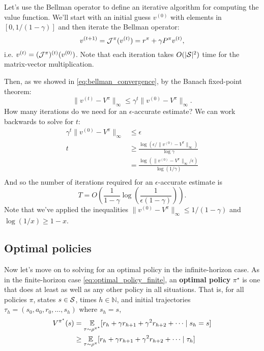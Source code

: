 \documentclass[../main/main]{subfiles}
\begin{document}
Let's use the Bellman operator to define an iterative algorithm for computing the value function. We'll start with an initial guess $v^{(0)}$ with elements in $[0, 1/(1-\gamma)]$ and then iterate the Bellman operator:
\[
    v^{(t+1)} = \bop^{\pi}(v^{(t)}) = r^{\pi} + \gamma P^{\pi} v^{(t)},
\]
i.e. $v^{(t)} = (\bop^{\pi})^{(t)} (v^{(0)})$. Note that each iteration takes $O(|\S|^2)$ time for the matrix-vector multiplication.

Then, as we showed in \eqref{eq:bellman_convergence}, by the Banach fixed-point theorem:
\[
    \|v^{(t)} - V^\pi \|_{\infty} \le \gamma^{t} \| v^{(0)} - V^\pi\|_{\infty}.
\]
How many iterations do we need for an $\epsilon$-accurate estimate? We can work backwards to solve for $t$:
\begin{align*}
    \gamma^t \|v^{(0)} - V^\pi\|_{\infty} &\le \epsilon \\
    t &\ge \frac{\log (\epsilon / \|v^{(0)} - V^\pi\|_{\infty})}{\log \gamma} \\
    &= \frac{\log (\|v^{(0)} - V^\pi\|_{\infty} / \epsilon)}{\log (1 / \gamma)} \\
\end{align*}
And so the number of iterations required for an $\epsilon$-accurate estimate is
\begin{equation}
    T = O\left( \frac{1}{1-\gamma} \log\left(\frac{1}{\epsilon (1-\gamma)}\right) \right). \label{eq:iterations_vi}
\end{equation}
Note that we've applied the inequalities $\|v^{(0)} - V^\pi\|_{\infty} \le 1/(1-\gamma)$ and $\log (1/x) \ge 1-x$.

\subsection{Optimal policies}

Now let's move on to solving for an optimal policy in the infinite-horizon case. As in the finite-horizon case \eqref{eq:optimal_policy_finite}, an \textbf{optimal policy} $\pi^\star$ is one that does at least as well as any other policy in all situations. That is, for all policies $\pi$, states $s \in \S$, times $h \in \mathbb{N}$, and initial trajectories $\tau_h = (s_0, a_0, r_0, \dots, s_h)$ where $s_h = s$,
\begin{equation}
    \begin{aligned}
        V^{\pi^\star}(s) &= \E_{\tau \sim \rho^{\pi^{\star}}}[r_h + \gamma r_{h+1} + \gamma^2 r_{h+2}  + \cdots \mid s_h = s] \\
        &\ge \E_{\tau \sim \rho^{\pi}}[r_h + \gamma r_{h+1} + \gamma^2 r_{h+2} + \cdots \mid \tau_h]
    \end{aligned}
    \label{eq:optimal_policy_infinite}
\end{equation}
\end{document}
